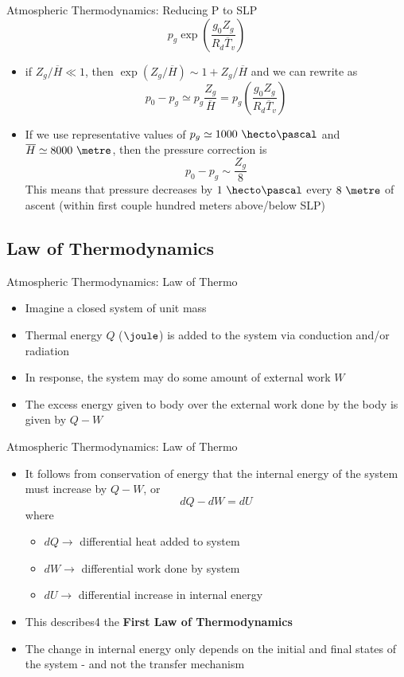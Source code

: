 \begin{frame}{Atmospheric Thermodynamics: Reducing P to SLP}
$$p_g \exp{\left(\frac{g_0Z_g}{R_d\overline{T}_v}\right)}$$
\begin{itemize}
	\item if $Z_g/\overline{H} \ll 1$, then $\exp{\left(Z_g/\overline{H}\right)}\sim 1+Z_g/\overline{H}$ and we can rewrite as
	$$p_0 - p_g \simeq p_g\frac{Z_g}{\overline{H}} = p_g\left(\frac{g_0 Z_g}{R_d \overline{T}_v}\right)$$
	\item If we use representative values of $p_g\simeq1000\ \hecto\pascal$ and $\overline{H} \simeq 8000\ \metre$, then the pressure correction is
	$$p_0 - p_g \sim \frac{Z_g}{8}$$
	This means that pressure decreases by $1\ \hecto\pascal$ every $8\ \metre$ of ascent (within first couple hundred meters above/below SLP)
\end{itemize}
\end{frame}
\subsection{ Law of Thermodynamics}
\begin{frame}{Atmospheric Thermodynamics:  Law of Thermo}
\begin{itemize}
	\item Imagine a closed system of unit mass
	\item Thermal energy $Q$ ($\joule$) is added to the system via conduction and/or radiation
	\item In response, the system may do some amount of external work $W$
	\item The excess energy given to body over the external work done by the body is given by $Q-W$
\end{itemize}
\end{frame}
\begin{frame}{Atmospheric Thermodynamics:  Law of Thermo}
\begin{itemize}
	\item It follows from conservation of energy that the internal energy of the system must increase by $Q-W$, or
	$$dQ - dW = dU$$
	where
	\begin{itemize}
		\item $dQ \rightarrow$ differential heat added to system
		\item $dW \rightarrow$ differential work done by system
		\item $dU \rightarrow$ differential increase in internal energy
	\end{itemize}
	\item This describes4 the \textbf{First Law of Thermodynamics}
	\item The change in internal energy only depends on the initial and final states of the system - and not the transfer mechanism
\end{itemize}
\end{frame}


